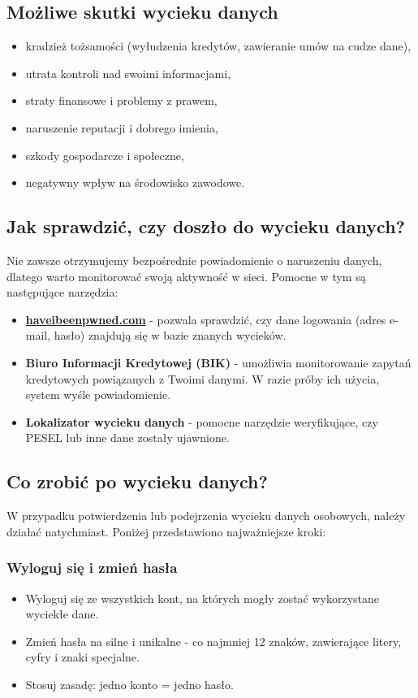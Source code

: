 \subsection{Możliwe skutki wycieku danych}
\begin{itemize}
    \item kradzież tożsamości (wyłudzenia kredytów, zawieranie umów na cudze dane),
    \item utrata kontroli nad swoimi informacjami,
    \item straty finansowe i problemy z prawem,
    \item naruszenie reputacji i dobrego imienia,
    \item szkody gospodarcze i społeczne,
    \item negatywny wpływ na środowisko zawodowe.
\end{itemize}

\subsection{Jak sprawdzić, czy doszło do wycieku danych?}

Nie zawsze otrzymujemy bezpośrednie powiadomienie o naruszeniu danych, dlatego warto monitorować swoją aktywność w sieci. Pomocne w tym są następujące narzędzia:

\begin{itemize}
    \item \textbf{\href{https://haveibeenpwned.com}{haveibeenpwned.com}} - pozwala sprawdzić, czy dane logowania (adres e-mail, hasło) znajdują się w bazie znanych wycieków.
    \item \textbf{Biuro Informacji Kredytowej (BIK)} - umożliwia monitorowanie zapytań kredytowych powiązanych z Twoimi danymi. W razie próby ich użycia, system wyśle powiadomienie.
    \item \textbf{Lokalizator wycieku danych} - pomocne narzędzie weryfikujące, czy PESEL lub inne dane zostały ujawnione.
\end{itemize}

\subsection{Co zrobić po wycieku danych?}

W przypadku potwierdzenia lub podejrzenia wycieku danych osobowych, należy działać natychmiast. Poniżej przedstawiono najważniejsze kroki:

\subsubsection{Wyloguj się i zmień hasła}
\begin{itemize}
    \item Wyloguj się ze wszystkich kont, na których mogły zostać wykorzystane wyciekłe dane.
    \item Zmień hasła na silne i unikalne - co najmniej 12 znaków, zawierające litery, cyfry i znaki specjalne.
    \item Stosuj zasadę: jedno konto = jedno hasło.
\end{itemize}

